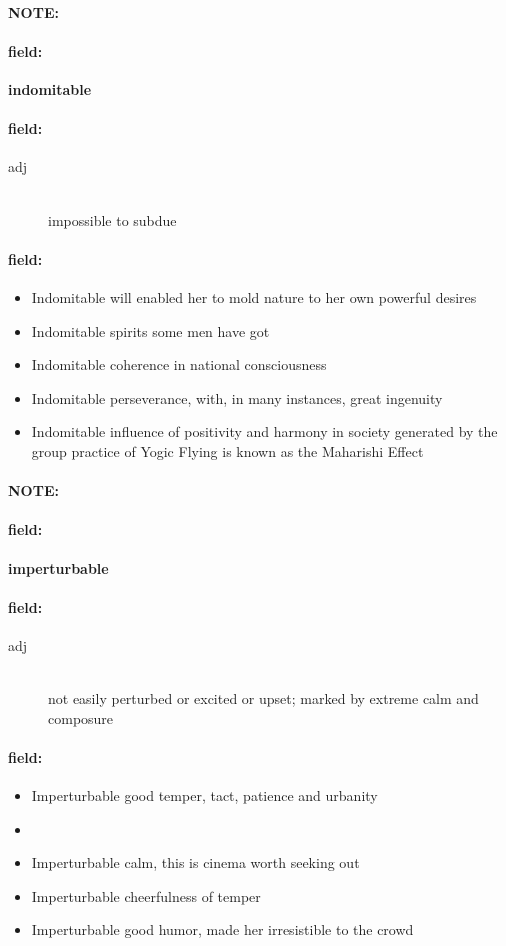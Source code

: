 \documentclass[12pt]{article}
\newenvironment{note}{\paragraph{NOTE:}}{}
\newenvironment{field}{\paragraph{field:}}{}
\begin{document}
\begin{note}
\begin{field}
\textbf{\large indomitable}
\end{field}


\begin{field}
\begin{description}
\item[adj] \hfill \\ 
impossible to subdue

\end{description}
\end{field}

\begin{field}
\begin{itemize}
\item Indomitable will enabled her to mold nature to her own powerful desires
\item Indomitable spirits some men have got
\item Indomitable coherence in national consciousness
\item Indomitable perseverance, with, in many instances, great ingenuity
\item Indomitable influence of positivity and harmony in society generated by the group practice of Yogic Flying is known as the Maharishi Effect
\end{itemize}
\end{field}
\end{note}
\begin{note}
\begin{field}
\textbf{\large imperturbable}
\end{field}


\begin{field}
\begin{description}
\item[adj] \hfill \\ 
not easily perturbed or excited or upset; marked by extreme calm and composure

\end{description}
\end{field}

\begin{field}
\begin{itemize}
\item Imperturbable good temper, tact, patience and urbanity
\item 
\item Imperturbable calm, this is cinema worth seeking out
\item Imperturbable cheerfulness of temper
\item Imperturbable good humor, made her irresistible to the crowd
\end{itemize}
\end{field}
\end{note}
\end{document}
